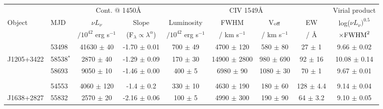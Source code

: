 \begin{table*}
  \small
  \begin{centering}
    \begin{tabular}{l  l | c c | c c c c | c}
      \hline
      \hline
                        &                   &  \multicolumn{2}{c}{Cont. @ 1450\AA }                                           &   \multicolumn{4}{c}{CIV 1549\AA}                                                                          &  Virial product \\
       Object      &   MJD           &       $\nu L_{\nu}$             &         Slope                                               &   Luminosity                &     FWHM               &    V$_{\rm off}$          &          EW        &  log($\nu L_{\nu})^{0.5} $ \\
                       &                     & $/10^{42}$ erg s$^{-1}$ & (F$_\lambda \propto \lambda^\alpha$)    & $/10^{42}$ erg s$^{-1}$ &    / km s$^{-1}$ &  /  km s$^{-1}$         &     /  \AA   & $\times {\rm FWHM}^2$   \\
      \hline
                       &  53498          &   41630   $\pm$   40    &  -1.70 $\pm$ 0.01                               &   700    $\pm$ 49       &  4700 $\pm$  120     &     580    $\pm$   80      &   27  $\pm$  1      &  9.66 $\pm$ 0.02\\
 J1205+3422  &  58538$^*$   &    2870    $\pm$   40     &  -1.29 $\pm$ 0.09                              &  170    $\pm$ 30      & 14900 $\pm$ 2800   &     980    $\pm$  690      &   92    $\pm$    16        & 10.08  $\pm$ 0.14 \\
                       &  58693          &    9050    $\pm$   10     &  -1.46 $\pm$ 0.00                              &  400   $\pm$   5       &  6980 $\pm$   90      &    1080    $\pm$   30      &   70 $\pm$  1  &  9.67 $\pm$ 0.01\\
                       &                      &                                      &                                                             &                                  &                                   &                                       &                                   &                  \\
                       &  54553         &    4060    $\pm$  120    &  -1.4  $\pm$ 0.2                                 & 330      $\pm$ 10      &  4630 $\pm$  190     &     180    $\pm$   60     &  128  $\pm$  4.4   &  9.14 $\pm$ 0.04\\
 J1638+2827   &  55832        &    2570    $\pm$   20      &  -2.16 $\pm$ 0.06                             & 100    $\pm$  5        &  4990 $\pm$  300      &     190    $\pm$   90      &   64  $\pm$  3.2   &  9.10 $\pm$ 0.05\\

\end{tabular}
\end{centering}
\end{table*}
